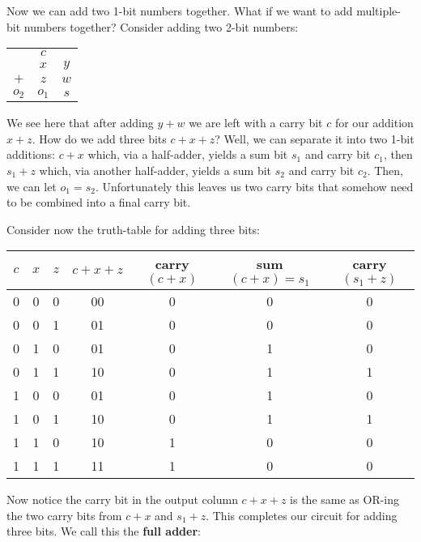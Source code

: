 \documentclass[main.tex]{subfiles}
\begin{document}
Now we can add two 1-bit numbers together. What if we want to add multiple-bit numbers together? Consider adding two 2-bit numbers:
\begin{center}
	\begin{tabular}{ccc}
		& \(c\) & \\
		& \(x\) & \(y\) \\
		\(+\) & \(z\) & \(w\) \\
		\midrule
		\(o_2\) & \(o_1\) & \(s\)
	\end{tabular}
\end{center}

We see here that after adding \(y+w\) we are left with a carry bit \(c\) for our addition \(x+z\). How do we add three bits \(c+x+z\)? Well, we can separate it into two 1-bit additions: \(c+x\) which, via a half-adder, yields a sum bit \(s_1\) and carry bit \(c_1\), then \(s_1 + z\) which, via another half-adder, yields a sum bit \(s_2\) and carry bit \(c_2\). Then, we can let \(o_1 = s_2\). Unfortunately this leaves us two carry bits that somehow need to be combined into a final carry bit.

Consider now the truth-table for adding three bits:
\begin{center}
	\begin{tabular}{ccc|c|ccc}
		\(c\) & \(x\) & \(z\) & \(c+x+z\) & carry\((c+x)\)  & sum\((c+x) = s_1\) & carry\((s_1+z)\) \\
		\midrule
		0 & 0 & 0 & 00 & 0 & 0 & 0 \\
		0 & 0 & 1 & 01 & 0 & 0 & 0 \\
		0 & 1 & 0 & 01 & 0 & 1 & 0 \\
		0 & 1 & 1 & 10 & 0 & 1 & 1 \\
		1 & 0 & 0 & 01 & 0 & 1 & 0 \\
		1 & 0 & 1 & 10 & 0 & 1 & 1 \\
		1 & 1 & 0 & 10 & 1 & 0 & 0 \\
		1 & 1 & 1 & 11 & 1 & 0 & 0 \\
	\end{tabular}
\end{center}

Now notice the carry bit in the output column \(c+x+z\) is the same as OR-ing the two carry bits from \(c+x\) and \(s_1+z\). This completes our circuit for adding three bits. We call this the \textbf{full adder}:
\end{document}
